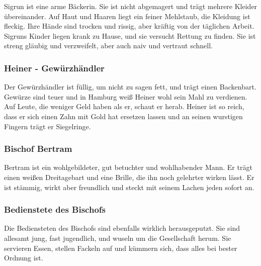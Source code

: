 Sigrun ist eine arme Bäckerin. Sie ist nicht abgemagert und trägt mehrere Kleider übereinander. Auf Haut und Haaren liegt ein feiner Mehlstaub, die Kleidung ist fleckig. Ihre Hände sind trocken und rissig, aber kräftig von der täglichen Arbeit. Sigruns Kinder liegen krank zu Hause, und sie versucht Rettung zu finden. Sie ist streng gläubig und verzweifelt, aber auch naiv und vertraut schnell.

\subsubsection*{Heiner - Gewürzhändler}
\label{Heiner}

Der Gewürzhändler ist füllig, um nicht zu sagen fett, und trägt einen Backenbart. Gewürze sind teuer und in Hamburg weiß Heiner wohl sein Mahl zu verdienen. Auf Leute, die weniger Geld haben als er, schaut er herab. Heiner ist so reich, dass er sich einen Zahn mit Gold hat ersetzen lassen und an seinen wurstigen Fingern trägt er Siegelringe.

\subsubsection*{Bischof Bertram}
\label{Bertram}

Bertram ist ein wohlgebildeter, gut betuchter und wohlhabender Mann. Er trägt einen weißen Dreitagebart und eine Brille, die ihn noch gelehrter wirken lässt. Er ist stämmig, wirkt aber freundlich und steckt mit seinem Lachen jeden sofort an.

\subsubsection*{Bedienstete des Bischofs}
\label{Bischofdiener}

Die Bediensteten des Bischofs sind ebenfalls wirklich herausgeputzt. Sie sind allesamt jung, fast jugendlich, und wuseln um die Gesellschaft herum. Sie servieren Essen, stellen Fackeln auf und kümmern sich, dass alles bei bester Ordnung ist.
